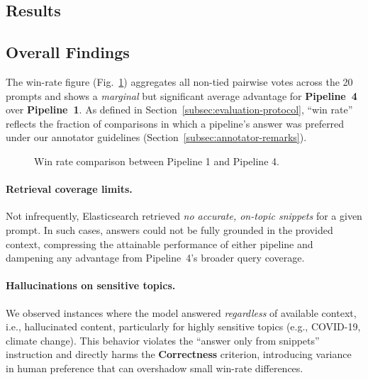 \documentclass[manuscript,screen]{acmart}
\begin{document}
\begin{CCSXML}
	
\section{Results}
\label{sec:results}

	\subsection{Overall Findings}
	\label{subsec:overall-findings}
	
	The win-rate figure (Fig.~\ref{fig:winrate-overall}) aggregates all non-tied
	pairwise votes across the 20 prompts and shows a \emph{marginal} but significant average
	advantage for \textbf{Pipeline~4} over \textbf{Pipeline~1}. As defined in
	Section~\ref{subsec:evaluation-protocol}, “win rate” reflects the fraction of
	comparisons in which a pipeline’s answer was preferred under our annotator
	guidelines (Section~\ref{subsec:annotator-remarks}).
	
	\begin{figure}[H]
	\centering
	\caption{Win rate comparison between Pipeline 1 and Pipeline 4.}
	\label{fig:winrate-overall}
	\end{figure}
	
	\paragraph{Retrieval coverage limits.}
	Not infrequently, Elasticsearch retrieved \emph{no accurate, on-topic snippets}
	for a given prompt. In such cases, answers could not be fully grounded in the
	provided context, compressing the attainable performance of either pipeline and
	dampening any advantage from Pipeline~4’s broader query coverage.
	
	\paragraph{Hallucinations on sensitive topics.}
	We observed instances where the model answered \emph{regardless} of available
	context, i.e., hallucinated content, particularly for highly sensitive topics
	(e.g., COVID-19, climate change). This behavior violates the “answer only from
	snippets” instruction and directly harms the \textbf{Correctness} criterion,
	introducing variance in human preference that can overshadow small win-rate
	differences.
	

\end{CCSXML}
\end{document}
